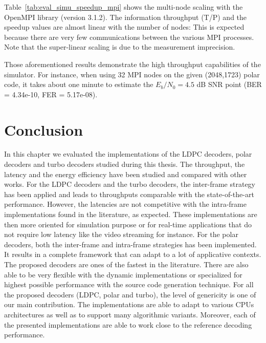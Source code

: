 Table~\ref{tab:eval_simu_speedup_mpi} shows the multi-node scaling with the
OpenMPI library (version 3.1.2). The information throughput (T/P) and the
speedup values are almost linear with the number of nodes: This is expected
because there are very few communications between the various MPI processes.
Note that the super-linear scaling is due to the measurement imprecision.

Those aforementioned results demonstrate the high throughput
capabilities of the \AFFECT simulator. For instance, when using 32 MPI nodes on
the given (2048,1723) polar code, it takes about one minute to estimate the
$E_b/N_0=4.5$ dB SNR point (BER = 4.34e-10, FER = 5.17e-08).

\section{Conclusion}

In this chapter we evaluated the implementations of the LDPC decoders, polar
decoders and turbo decoders studied during this thesis. The throughput, the
latency and the energy efficiency have been studied and compared with other
works. For the LDPC decoders and the turbo decoders, the inter-frame strategy
has been applied and leads to throughputs comparable with the state-of-the-art
performance. However, the latencies are not competitive with the intra-frame
implementations found in the literature, as expected. These implementations are
then more oriented for simulation purpose or for real-time applications that do
not require low latency like the video streaming for instance. For the polar
decoders, both the inter-frame and intra-frame strategies has been implemented.
It results in a complete framework that can adapt to a lot of applicative
contexts. The proposed decoders are ones of the fastest in the literature. There
are also able to be very flexible with the dynamic implementations or
specialized for highest possible performance with the source code generation
technique. For all the proposed decoders (LDPC, polar and turbo), the level of
genericity is one of our main contribution. The implementations are able to
adapt to various CPUs architectures as well as to support many algorithmic
variants. Moreover, each of the presented implementations are able to work close
to the reference decoding performance.

